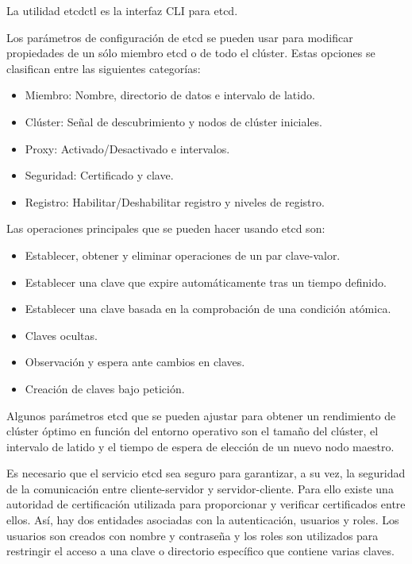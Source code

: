 La utilidad etcdctl es la interfaz CLI para etcd.

Los parámetros de configuración de etcd se pueden usar para modificar propiedades de un sólo miembro etcd o de todo el clúster. Estas opciones se clasifican entre las siguientes categorías:

\begin{itemize}
\item Miembro: Nombre, directorio de datos e intervalo de latido.
\item Clúster: Señal de descubrimiento y nodos de clúster iniciales.
\item Proxy: Activado/Desactivado e intervalos.
\item Seguridad: Certificado y clave.
\item Registro: Habilitar/Deshabilitar registro y niveles de registro.
\end{itemize}

Las operaciones principales que se pueden hacer usando etcd son:

\begin{itemize}
\item Establecer, obtener y eliminar operaciones de un par clave-valor.
\item Establecer una clave que expire automáticamente tras un tiempo definido. 
\item Establecer una clave basada en la comprobación de una condición atómica.
\item Claves ocultas.
\item Observación y espera ante cambios en claves.
\item Creación de claves bajo petición.
\end{itemize}

Algunos parámetros etcd que se pueden ajustar para obtener un rendimiento de clúster óptimo en función del entorno operativo son el tamaño del clúster, el intervalo de latido y el tiempo de espera de elección de un nuevo nodo maestro. 

Es necesario que el servicio etcd sea seguro para garantizar, a su vez, la seguridad de la comunicación entre cliente-servidor y servidor-cliente. Para ello existe una autoridad de certificación utilizada para proporcionar y verificar certificados entre ellos. Así, hay dos entidades asociadas con la autenticación, usuarios y roles. Los usuarios son creados con nombre y contraseña y los roles son utilizados para restringir el acceso a una clave o directorio específico que contiene varias claves. 


